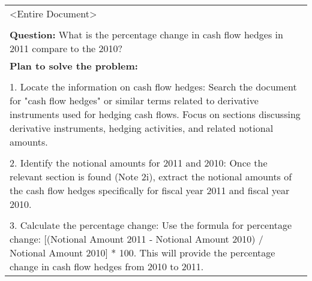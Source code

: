 \begin{table*}
\centering
\footnotesize
\begin{tabular}{p{\linewidth}}
\toprule
\textless{}Entire Document\textgreater\\ \\ \textbf{Question:} What is the percentage change in cash flow hedges in 2011 compare to the 2010? \\ \midrule
\textbf{Plan to solve the problem:}\\ \\ 1. Locate the information on cash flow hedges: Search the document for "cash flow hedges" or similar terms related to derivative instruments used for hedging cash flows.  Focus on sections discussing derivative instruments, hedging activities, and related notional amounts.\\ \\ 2. Identify the notional amounts for 2011 and 2010: Once the relevant section is found (Note 2i), extract the notional amounts of the cash flow hedges specifically for fiscal year 2011 and fiscal year 2010.\\ \\ 3. Calculate the percentage change: Use the formula for percentage change: {[}(Notional Amount 2011 - Notional Amount 2010) / Notional Amount 2010{]} * 100.  This will provide the percentage change in cash flow hedges from 2010 to 2011. \\ \midrule

\end{tabular}
\end{table*}
